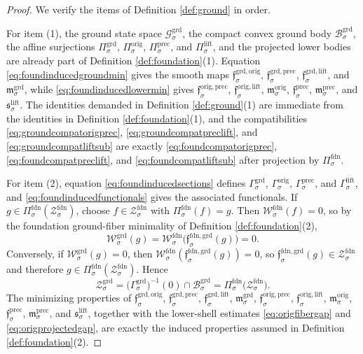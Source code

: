\documentclass[11pt]{article}
\newcommand{\LiftProj}[1]{\Pi_{#1}^{\mathrm{lift}}}
\newcommand{\LiftSelect}[1]{\mathfrak s_{#1}^{\mathrm{lift}}}
\newcommand{\LiftSection}[1]{\Gamma_{#1}^{\mathrm{lift}}}
\newcommand{\PrecProj}[1]{\Pi_{#1}^{\mathrm{prec}}}
\newcommand{\PrecLiftMin}[1]{\mathfrak f_{#1}^{\mathrm{prec}}}
\newcommand{\PrecSubMin}[1]{\mathfrak m_{#1}^{\mathrm{prec}}}
\newcommand{\PrecSection}[1]{\Gamma_{#1}^{\mathrm{prec}}}
\newcommand{\OrigProj}[1]{\Pi_{#1}^{\mathrm{orig}}}
\newcommand{\OrigPrecMin}[1]{\mathfrak f_{#1}^{\mathrm{orig,prec}}}
\newcommand{\OrigLiftMin}[1]{\mathfrak f_{#1}^{\mathrm{orig,lift}}}
\newcommand{\OrigSubMin}[1]{\mathfrak m_{#1}^{\mathrm{orig}}}
\newcommand{\OrigSection}[1]{\Gamma_{#1}^{\mathrm{orig}}}
\newcommand{\GroundSpace}[1]{\mathcal G_{#1}^{\mathrm{grd}}}
\newcommand{\GroundBody}[1]{\mathcal B_{#1}^{\mathrm{grd}}}
\newcommand{\GroundProj}[1]{\Pi_{#1}^{\mathrm{grd}}}
\newcommand{\GroundOrigMin}[1]{\mathfrak f_{#1}^{\mathrm{grd,orig}}}
\newcommand{\GroundPrecMin}[1]{\mathfrak f_{#1}^{\mathrm{grd,prec}}}
\newcommand{\GroundLiftMin}[1]{\mathfrak f_{#1}^{\mathrm{grd,lift}}}
\newcommand{\GroundSubMin}[1]{\mathfrak m_{#1}^{\mathrm{grd}}}
\newcommand{\GroundSection}[1]{\Gamma_{#1}^{\mathrm{grd}}}
\newcommand{\GroundFunctional}[1]{\mathscr W_{#1}^{\mathrm{grd}}}
\newcommand{\GroundShellSet}[1]{\mathcal Z_{#1}^{\mathrm{grd}}}
\newcommand{\FoundProj}[1]{\Pi_{#1}^{\mathrm{fdn}}}
\newcommand{\FoundGroundMin}[1]{\mathfrak f_{#1}^{\mathrm{fdn,grd}}}
\newcommand{\FoundFunctional}[1]{\mathscr W_{#1}^{\mathrm{fdn}}}
\newcommand{\FoundShellSet}[1]{\mathcal Z_{#1}^{\mathrm{fdn}}}
\begin{document}
\begin{proof}
We verify the items of Definition \ref{def:ground} in order.

For item (1), the ground state space \(\GroundSpace{\sigma}\), the compact convex ground body \(\GroundBody{\sigma}\), the affine surjections \(\GroundProj{\sigma}\), \(\OrigProj{\sigma}\), \(\PrecProj{\sigma}\), and \(\LiftProj{\sigma}\), and the projected lower bodies are already part of Definition \ref{def:foundation}(1). Equation \eqref{eq:foundinducedgroundmin} gives the smooth maps \(\GroundOrigMin{\sigma}\), \(\GroundPrecMin{\sigma}\), \(\GroundLiftMin{\sigma}\), and \(\GroundSubMin{\sigma}\), while \eqref{eq:foundinducedlowermin} gives \(\OrigPrecMin{\sigma}\), \(\OrigLiftMin{\sigma}\), \(\OrigSubMin{\sigma}\), \(\PrecLiftMin{\sigma}\), \(\PrecSubMin{\sigma}\), and \(\LiftSelect{\sigma}\). The identities demanded in Definition \ref{def:ground}(1) are immediate from the identities in Definition \ref{def:foundation}(1), and the compatibilities \eqref{eq:groundcompatorigprec}, \eqref{eq:groundcompatpreclift}, and \eqref{eq:groundcompatliftsub} are exactly \eqref{eq:foundcompatorigprec}, \eqref{eq:foundcompatpreclift}, and \eqref{eq:foundcompatliftsub} after projection by \(\FoundProj{\sigma}\).

For item (2), equation \eqref{eq:foundinducedsections} defines \(\GroundSection{\sigma}\), \(\OrigSection{\sigma}\), \(\PrecSection{\sigma}\), and \(\LiftSection{\sigma}\), and \eqref{eq:foundinducedfunctionals} gives the associated functionals. If \(g\in\FoundProj{\sigma}(\FoundShellSet{\sigma})\), choose \(f\in\FoundShellSet{\sigma}\) with \(\FoundProj{\sigma}(f)=g\). Then \(\FoundFunctional{\sigma}(f)=0\), so by the foundation ground-fiber minimality of Definition \ref{def:foundation}(2),
\[
\GroundFunctional{\sigma}(g)
=
\FoundFunctional{\sigma}\bigl(\FoundGroundMin{\sigma}(g)\bigr)
=
0.
\]
Conversely, if \(\GroundFunctional{\sigma}(g)=0\), then \(\FoundFunctional{\sigma}(\FoundGroundMin{\sigma}(g))=0\), so \(\FoundGroundMin{\sigma}(g)\in\FoundShellSet{\sigma}\) and therefore \(g\in\FoundProj{\sigma}(\FoundShellSet{\sigma})\). Hence
\[
\GroundShellSet{\sigma}
=
\bigl(\GroundSection{\sigma}\bigr)^{-1}(0)\cap\GroundBody{\sigma}
=
\FoundProj{\sigma}\bigl(\FoundShellSet{\sigma}\bigr).
\]
The minimizing properties of \(\GroundOrigMin{\sigma}\), \(\GroundPrecMin{\sigma}\), \(\GroundLiftMin{\sigma}\), \(\GroundSubMin{\sigma}\), \(\OrigPrecMin{\sigma}\), \(\OrigLiftMin{\sigma}\), \(\OrigSubMin{\sigma}\), \(\PrecLiftMin{\sigma}\), \(\PrecSubMin{\sigma}\), and \(\LiftSelect{\sigma}\), together with the lower-shell estimates \eqref{eq:origfibergap} and \eqref{eq:origprojectedgap}, are exactly the induced properties assumed in Definition \ref{def:foundation}(2).


\end{proof}
\end{document}
